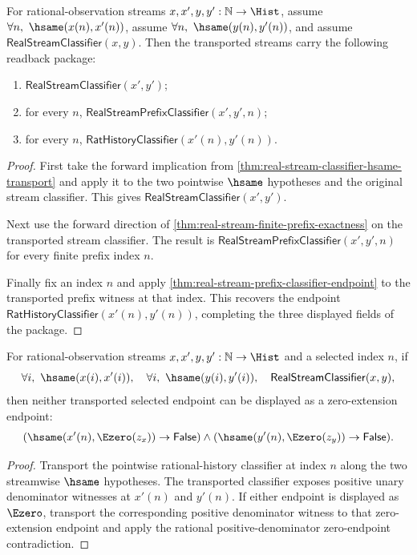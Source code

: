 \begin{theorem}
\label{thm:real-stream-classifier-transport-with-endpoint-readback}
For rational-observation streams $x,x',y,y':\mathbb{N}\to\Hist$, assume
$\forall n,\ \hsame(x(n),x'(n))$, assume
$\forall n,\ \hsame(y(n),y'(n))$, and assume
$\mathsf{RealStreamClassifier}(x,y)$. Then the transported streams carry the
following readback package:
\begin{enumerate}
  \item $\mathsf{RealStreamClassifier}(x',y')$;
  \item for every $n$,
  $\mathsf{RealStreamPrefixClassifier}(x',y',n)$;
  \item for every $n$,
  $\mathsf{RatHistoryClassifier}(x'(n),y'(n))$.
\end{enumerate}
\end{theorem}
\begin{proof}
First take the forward implication from
\autoref{thm:real-stream-classifier-hsame-transport} and apply it to the two
pointwise $\hsame$ hypotheses and the original stream classifier. This gives
$\mathsf{RealStreamClassifier}(x',y')$.

Next use the forward direction of
\autoref{thm:real-stream-finite-prefix-exactness} on the transported stream
classifier. The result is
$\mathsf{RealStreamPrefixClassifier}(x',y',n)$ for every finite prefix index
$n$.

Finally fix an index $n$ and apply
\autoref{thm:real-stream-prefix-classifier-endpoint} to the transported prefix
witness at that index. This recovers the endpoint
$\mathsf{RatHistoryClassifier}(x'(n),y'(n))$, completing the three displayed
fields of the package.
\end{proof}

\begin{theorem}
\label{thm:real-stream-classifier-transport-selected-e0-endpoint-absurd}
For rational-observation streams $x,x',y,y':\mathbb{N}\to\Hist$ and a
selected index $n$, if
$$
\forall i,\ \hsame(x(i),x'(i)),\quad
\forall i,\ \hsame(y(i),y'(i)),\quad
\mathsf{RealStreamClassifier}(x,y),
$$
then neither transported selected endpoint can be displayed as a
zero-extension endpoint:
$$
(\hsame(x'(n),\Ezero(z_x))\to\mathsf{False})\land
(\hsame(y'(n),\Ezero(z_y))\to\mathsf{False}).
$$
\end{theorem}
\begin{proof}
Transport the pointwise rational-history classifier at index $n$ along the
two streamwise $\hsame$ hypotheses. The transported classifier exposes
positive unary denominator witnesses at $x'(n)$ and $y'(n)$. If either
endpoint is displayed as $\Ezero$, transport the corresponding positive
denominator witness to that zero-extension endpoint and apply the rational
positive-denominator zero-endpoint contradiction.
\end{proof}

